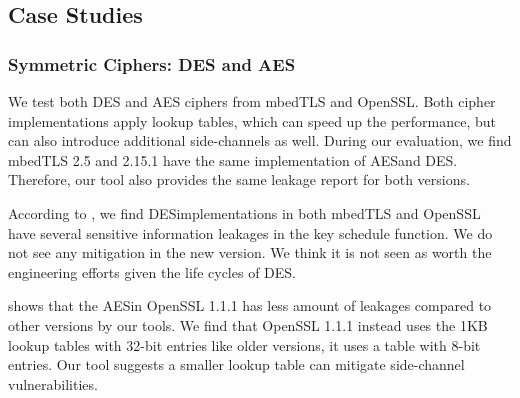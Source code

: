 \subsection{Case Studies}

\subsubsection{Symmetric Ciphers: DES and AES}\label{eval:sym}
We test both DES and AES ciphers from mbedTLS and OpenSSL. Both cipher
implementations apply lookup tables, which can
speed up the performance, but can also introduce additional side-channels
as well. During our evaluation, we find mbedTLS 2.5 and 2.15.1 have the same
implementation of AES\@ and DES\@. Therefore, our tool also provides the same 
leakage report for both
versions. 

According to \tool{}, we find DES\@ implementations in both mbedTLS and OpenSSL have several
sensitive information leakages in the key schedule function.
We do not see any mitigation
in the new version. We think it is not seen as worth the engineering
efforts given the life cycles of DES\@.

\tool{} shows that the AES\@ in OpenSSL 1.1.1 
has less amount of leakages compared to other versions by our tools. 
We find that OpenSSL 1.1.1 
instead uses the 1KB lookup tables with 32-bit entries like older versions, it uses a 
table with 8-bit entries. Our tool suggests a smaller lookup
table can mitigate side-channel vulnerabilities. 



